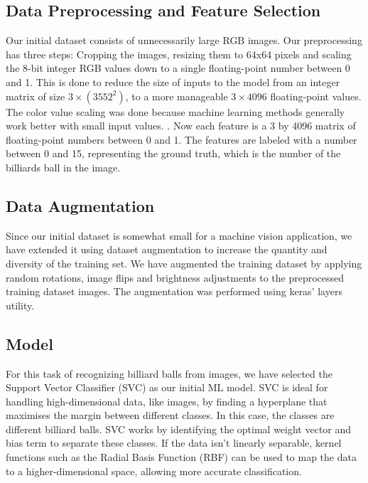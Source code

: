 \documentclass{article}
\begin{document}
\subsection{Data Preprocessing and Feature Selection}
\label{sec:data_preprocessing}
Our initial dataset consists of unnecessarily large RGB images. Our preprocessing has three steps: Cropping the images, resizing them to 64x64 pixels 
and scaling the 8-bit integer RGB values down to a single floating-point number between 0 and 1. This is done to reduce the size of inputs to the model 
from an integer matrix of size $3\times(3552^2)$, to a more manageable $3\times 4096$ floating-point values. The color value scaling was done because machine
learning methods generally work better with small input values. \cite{ImportanceFeatureScaling}. Now each feature is a 3 by 4096 matrix of floating-point
numbers between 0 and 1. The features are labeled with a number between 0 and 15, representing the ground truth, which is the number of the billiards ball in the image.

\subsection{Data Augmentation}
\label{sec:data_augmentation}
Since our initial dataset is somewhat small for a machine vision application, we have extended it using dataset augmentation to increase the quantity 
and diversity of the training set. We have augmented the training dataset by applying random rotations, 
image flips and brightness adjustments to the preprocessed training dataset images. The augmentation was performed using keras' layers utility.

\subsection{Model}
\label{sec:model}
For this task of recognizing billiard balls from images, we have selected the Support Vector Classifier (SVC) as our initial ML model. 
SVC is ideal for handling high-dimensional data, like images, by finding a hyperplane that maximises the margin between different classes. In this case, 
the classes are different billiard balls. SVC works by identifying the optimal weight vector and bias term to separate these classes. If the data isn't 
linearly separable, kernel functions such as the Radial Basis Function (RBF) can be used to map the data to a higher-dimensional space, allowing more 
accurate classification. \cite{nobleWhatSupportVector2006}
\end{document}
